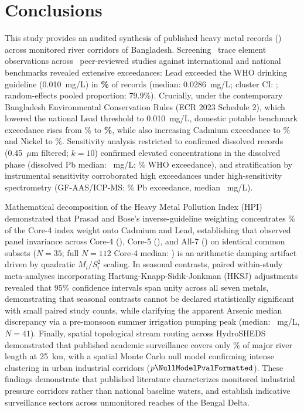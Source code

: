 \documentclass[authoryear,preprint,12pt]{elsarticle}
\begin{document}
\section{Conclusions}
This study provides an audited synthesis of published heavy metal records (\StudyWindowYears) across monitored river corridors of Bangladesh. Screening \TotalMetalRecords\ trace element observations across \TotalMetalStudies\ peer-reviewed studies against international and national benchmarks revealed extensive exceedances: Lead exceeded the WHO drinking guideline (0.010~mg/L) in \textbf{\LeadWhoExceedPct\%} of records (median: 0.0286~mg/L; cluster CI: \LeadWhoClusterCi; random-effects pooled proportion: 79.9\%). Crucially, under the contemporary Bangladesh Environmental Conservation Rules (ECR 2023 Schedule 2), which lowered the national Lead threshold to 0.010~mg/L, domestic potable benchmark exceedance rises from \LeadBdNineteenNinetySevenExceedPct\% to \textbf{\LeadBdTwentyTwentyThreeExceedPct\%}, while also increasing Cadmium exceedance to \CadmiumBdTwentyTwentyThreeExceedPct\% and Nickel to \NickelBdTwentyTwentyThreeExceedPct\%. Sensitivity analysis restricted to confirmed dissolved records (0.45~$\mu\text{m}$ filtered; $k=10$) confirmed elevated concentrations in the dissolved phase (dissolved Pb median: \LeadConfirmedDissolvedMedian~mg/L; \LeadConfirmedDissolvedWhoPct\% WHO exceedance), and stratification by instrumental sensitivity corroborated high exceedances under high-sensitivity spectrometry (GF-AAS/ICP-MS: \LeadHighSensExceedPct\% Pb exceedance, median \LeadHighSensMedian~mg/L).

Mathematical decomposition of the Heavy Metal Pollution Index ($\mathrm{HPI}$) demonstrated that Prasad and Bose's inverse-guideline weighting concentrates \HpiCdPbWeightSharePct\% of the Core-4 index weight onto Cadmium and Lead, establishing that observed panel invariance across Core-4 (\HpiCommonSubsetCoreFourMedian), Core-5 (\HpiCommonSubsetCoreFiveMedian), and All-7 (\HpiCommonSubsetAllSevenMedian) on identical common subsets ($N=35$; full $N=112$ Core-4 median: \HpiCoreFourMedian) is an arithmetic damping artifact driven by quadratic $M_i/S_i^2$ scaling. In seasonal contrasts, paired within-study meta-analyses incorporating Hartung-Knapp-Sidik-Jonkman (HKSJ) adjustments revealed that 95\% confidence intervals span unity across all seven metals, demonstrating that seasonal contrasts cannot be declared statistically significant with small paired study counts, while clarifying the apparent Arsenic median discrepancy via a pre-monsoon summer irrigation pumping peak (median: \ArsenicPremonsoonMedian~mg/L, $N=41$). Finally, spatial topological stream routing across HydroSHEDS demonstrated that published academic surveillance covers only \ObservedCoveredPct\% of major river length at 25~km, with a spatial Monte Carlo null model confirming intense clustering in urban industrial corridors ($p \NullModelPvalFormatted$). These findings demonstrate that published literature characterizes monitored industrial pressure corridors rather than national baseline waters, and establish indicative surveillance sectors across unmonitored reaches of the Bengal Delta.
\end{document}
